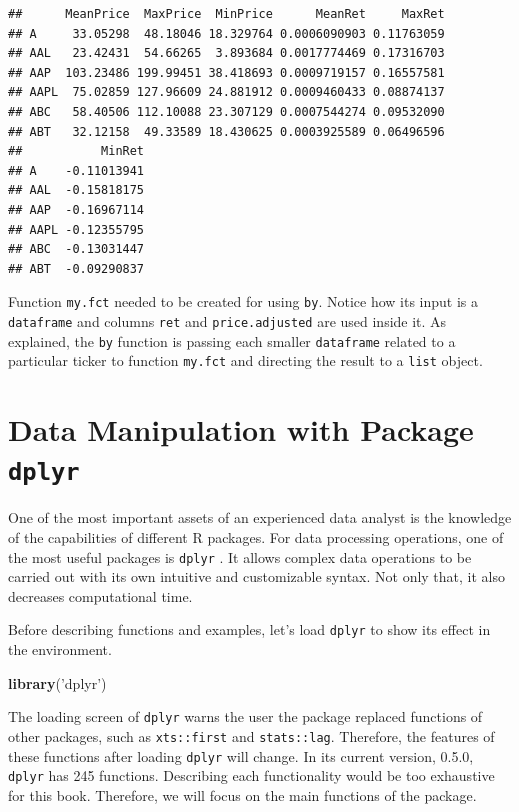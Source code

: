 \documentclass[11pt,]{book}
\newenvironment{Shaded}{\begin{snugshade}}{\end{snugshade}}
\newcommand{\KeywordTok}[1]{\textcolor[rgb]{0.27,0.27,0.27}{\textbf{#1}}}
\newcommand{\StringTok}[1]{\textcolor[rgb]{0.5,0.5,0.5}{#1}}
\newcommand{\NormalTok}[1]{#1}
\begin{document}
\begin{verbatim}
##      MeanPrice  MaxPrice  MinPrice      MeanRet     MaxRet
## A     33.05298  48.18046 18.329764 0.0006090903 0.11763059
## AAL   23.42431  54.66265  3.893684 0.0017774469 0.17316703
## AAP  103.23486 199.99451 38.418693 0.0009719157 0.16557581
## AAPL  75.02859 127.96609 24.881912 0.0009460433 0.08874137
## ABC   58.40506 112.10088 23.307129 0.0007544274 0.09532090
## ABT   32.12158  49.33589 18.430625 0.0003925589 0.06496596
##           MinRet
## A    -0.11013941
## AAL  -0.15818175
## AAP  -0.16967114
## AAPL -0.12355795
## ABC  -0.13031447
## ABT  -0.09290837
\end{verbatim}

Function \texttt{my.fct} needed to be created for using \texttt{by}.
Notice how its input is a \texttt{dataframe} and columns \texttt{ret}
and \texttt{price.adjusted} are used inside it. As explained, the
\texttt{by} function is passing each smaller \texttt{dataframe} related
to a particular ticker to function \texttt{my.fct} and directing the
result to a \texttt{list} object.

\section{\texorpdfstring{Data Manipulation with Package
\texttt{dplyr}}{Data Manipulation with Package dplyr}}\label{data-manipulation-with-package-dplyr}

One of the most important assets of an experienced data analyst is the
knowledge of the capabilities of different R packages. For data
processing operations, one of the most useful packages is \texttt{dplyr}
\citep{dplyr}. It allows complex data operations to be carried out with
its own intuitive and customizable syntax. Not only that, it also
decreases computational time. 

Before describing functions and examples, let's load \texttt{dplyr} to
show its effect in the environment.

\begin{Shaded}
\begin{Highlighting}[]
\KeywordTok{library}\NormalTok{(}\StringTok{'dplyr'}\NormalTok{)}
\end{Highlighting}
\end{Shaded}

The loading screen of \texttt{dplyr} warns the user the package replaced
functions of other packages, such as \texttt{xts::first} and
\texttt{stats::lag}. Therefore, the features of these functions after
loading \texttt{dplyr} will change. In its current version, 0.5.0,
\texttt{dplyr} has 245 functions. Describing each functionality would be
too exhaustive for this book. Therefore, we will focus on the main
functions of the package.
\end{document}
